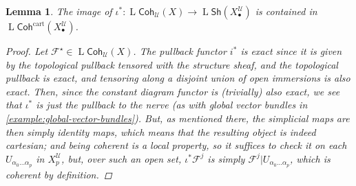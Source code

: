 \documentclass[11pt,fleqn]{article}
\theoremstyle{plain}
\newtheorem{lemma}[theorem]{Lemma}
\theoremstyle{definition}
\theoremstyle{remark}
\numberwithin{equation}{theorem}
\newcommand{\cover}{\mathcal{U}}
\newcommand{\anotherbullet}{\star}
\newcommand{\restricted}{\mathbin{\big\vert}}
\newcommand{\gcohUX}{\mathsf{Coh}_{\cover}(X)}
\newcommand{\shX}{\mathsf{Sh}(\nerve{\bullet})}
\newcommand{\cartcohX}{\mathsf{Coh}^\mathrm{cart}(X_\bullet^\cover)}
\newcommand{\nerve}[1]{X_{#1}^\cover}
\DeclareMathOperator{\LL}{L}
\begin{document}
        \begin{lemma}
            The image of $\iota^*\colon\LL{\gcohUX}\to\LL{\shX}$ is contained in $\LL{\cartcohX}$.

            \begin{proof}
                Let $\mathscr{F}^\anotherbullet\in\LL{\gcohUX}$.
                The pullback functor $i^*$ is exact since it is given by the topological pullback tensored with the structure sheaf, and the topological pullback is exact, and tensoring along a disjoint union of open immersions is also exact.
                Then, since the constant diagram functor is (trivially) also exact, we see that $\iota^*$ is just the pullback to the nerve (as with global vector bundles in \cref{example:global-vector-bundles}).
                But, as mentioned there, the simplicial maps are then simply identity maps, which means that the resulting object is indeed cartesian; and being coherent is a local property, so it suffices to check it on each $U_{\alpha_0\ldots\alpha_p}$ in $\nerve{p}$, but, over such an open set, $\iota^*\mathscr{F}^j$ is simply \mbox{$\mathscr{F}^j\restricted U_{\alpha_0\ldots\alpha_p}$}, which is coherent by definition.
            \end{proof}
        \end{lemma}
\end{document}
